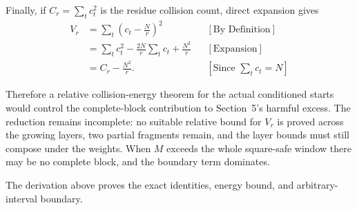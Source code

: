 Finally, if $C_r=\sum_tc_t^2$ is the residue collision count, direct
expansion gives
\begin{equation*}
\begin{aligned}
V_r
&=\sum_t\left(c_t-\frac Nr\right)^2
&&[\text{By Definition}]\\
&=\sum_tc_t^2-\frac{2N}{r}\sum_tc_t+\frac{N^2}{r}
&&[\text{Expansion}]\\
&=C_r-\frac{N^2}{r}.
&&[\text{Since }\sum_tc_t=N]
\end{aligned}
\end{equation*}

Therefore a relative collision-energy theorem for the actual conditioned
starts would control the complete-block contribution to Section~5's harmful excess.
The reduction remains incomplete: no suitable relative bound for $V_r$ is
proved across the growing layers, two partial fragments remain, and the layer
bounds must still compose under the weights. When $M$ exceeds the whole
square-safe window there may be no complete block, and the boundary term
dominates.

{\raggedright
The derivation above proves the exact identities, energy bound, and
arbitrary-interval boundary. \par}
